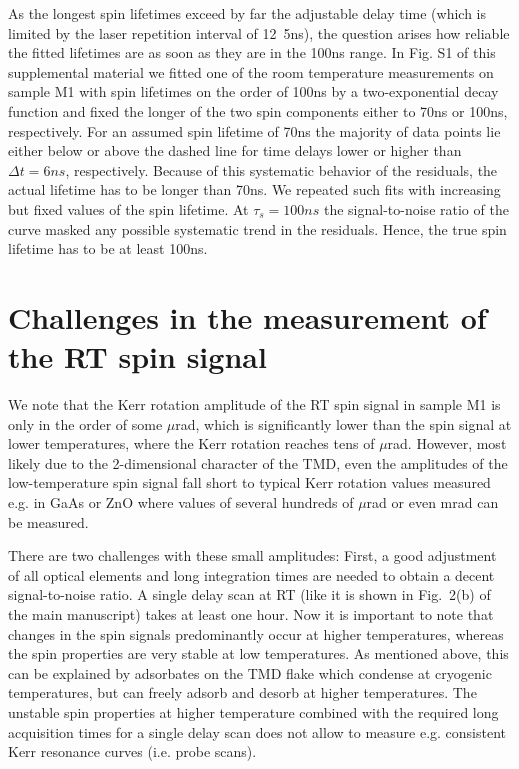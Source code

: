 \documentclass[prb,aps,superscriptaddress,reprint,floatfix]{revtex4-1}
\begin{document}
As the longest spin lifetimes exceed by far the adjustable delay time (which is limited by the laser repetition interval of \unit{12.5}{ns}), the question arises how reliable the fitted lifetimes are as soon as they are in the \unit{100}{ns} range. In Fig. S1 of this supplemental material we fitted one of the room temperature measurements on sample M1 with spin lifetimes on the order of \unit{100}{ns} by a two-exponential decay function and fixed the longer of the two spin components either to \unit{70}{ns} or \unit{100}{ns}, respectively. For an assumed spin lifetime of \unit{70}{ns} the majority of data points lie either below or above the dashed line for time delays lower or higher than $\Delta t = \unit{6}{ns}$, respectively. Because of this systematic behavior of the residuals, the actual lifetime has to be longer than \unit{70}{ns}. We repeated such fits with increasing but fixed values of the spin lifetime. At $\tau_s = \unit{100}{ns}$ the signal-to-noise ratio of the curve masked any possible systematic trend in the residuals. Hence, the true spin lifetime has to be at least \unit{100}{ns}.

\section{Challenges in the measurement of the RT spin signal}
We note that the Kerr rotation amplitude of the RT spin signal in sample M1 is only in the order of some $\mu$rad, which is significantly lower than the spin signal at lower temperatures, where the Kerr rotation reaches tens of $\mu$rad. However, most likely due to the 2-dimensional character of the TMD, even the amplitudes of the low-temperature spin signal fall short to typical Kerr rotation values measured e.g. in GaAs or ZnO where values of several hundreds of $\mu$rad or even mrad can be measured.\cite{PhysRevLett.105.246603, PSSB.251.1861}

There are two challenges with these small amplitudes: First, a good adjustment of all optical elements and long integration times are needed to obtain a decent signal-to-noise ratio. A single delay scan at RT (like it is shown in Fig.~2(b) of the main manuscript) takes at least one hour. Now it is important to note that changes in the spin signals predominantly occur at higher temperatures, whereas the spin properties are very stable at low temperatures.\cite{PhysRevB.95.235408} As mentioned above, this can be explained by adsorbates on the TMD flake which condense at cryogenic temperatures, but can freely adsorb and desorb at higher temperatures. The unstable spin properties at higher temperature combined with the required long acquisition times for a single delay scan does not allow to measure e.g. consistent Kerr resonance curves (i.e. probe scans). 
\end{document}

